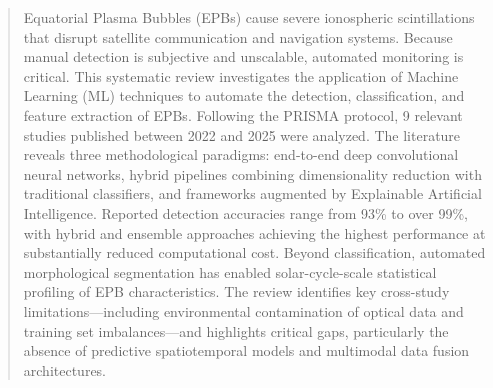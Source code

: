 \begin{abstract}

Equatorial Plasma Bubbles (EPBs) cause severe ionospheric scintillations
that disrupt satellite communication and navigation systems. Because
manual detection is subjective and unscalable, automated monitoring is
critical. This systematic review investigates the application of Machine
Learning (ML) techniques to automate the detection, classification, and
feature extraction of EPBs. Following the PRISMA protocol, 9 relevant
studies published between 2022 and 2025 were analyzed. The literature
reveals three methodological paradigms: end-to-end deep convolutional
neural networks, hybrid pipelines combining dimensionality reduction
with traditional classifiers, and frameworks augmented by Explainable
Artificial Intelligence. Reported detection accuracies range from 93\%
to over 99\%, with hybrid and ensemble approaches achieving the highest
performance at substantially reduced computational cost. Beyond
classification, automated morphological segmentation has enabled
solar-cycle-scale statistical profiling of EPB characteristics. The
review identifies key cross-study limitations---including environmental
contamination of optical data and training set imbalances---and
highlights critical gaps, particularly the absence of predictive
spatiotemporal models and multimodal data fusion architectures.

\end{abstract}
